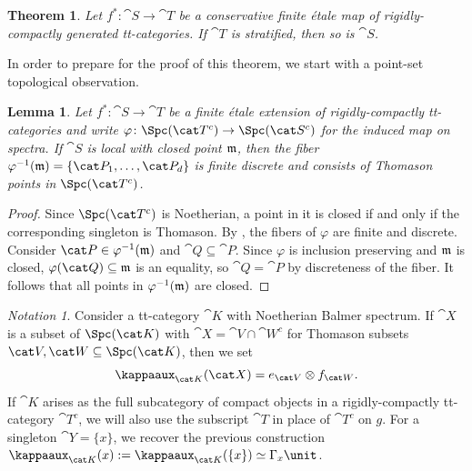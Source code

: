 \documentclass{amsart}%
\numberwithin{equation}{section}%
\newtheorem{Thm}[equation]{Theorem}
\newtheorem{Lem}[equation]{Lemma}
\theoremstyle{remark}
\newtheorem{Not}[equation]{Notation}
\begin{document}
\begin{Thm}\label{thm:etaledescent}
Let $f^*\colon \cat S \to \cat T$ be a conservative finite \'etale map of rigidly-compactly generated tt-categories. If $\cat T$ is stratified, then so is $\cat S$.
\end{Thm}

In order to prepare for the proof of this theorem, we start with a point-set topological observation.

\begin{Lem}\label{lem:closedfiber}
Let $f^*\colon \cat S \to \cat T$ be a finite \'etale extension of rigidly-compactly tt-categories and write $\varphi\colon \Spc(\cat T^c) \to \Spc(\cat S^c)$ for the induced map on spectra. If $\cat S$ is local with closed point $\frak m$, then the fiber $\varphi^{-1}(\frak m) = \{\cat P_1,\ldots, \cat P_d\}$ is finite discrete and consists of Thomason points in $\Spc(\cat T^c)$.
\end{Lem}
\begin{proof}
Since $\Spc(\cat T^c)$ is Noetherian, a point in it is closed if and only if the corresponding singleton is Thomason. By \cite[Thm.~1.5(d)]{Balmer16b}, the fibers of $\varphi$ are finite and discrete. Consider $\cat P \in \varphi^{-1}(\frak m)$ and $\cat Q \subseteq \cat P$. Since $\varphi$ is inclusion preserving and $\frak m$ is closed, $\varphi(\cat Q) \subseteq \frak m$ is an equality, so $\cat Q = \cat P$ by discreteness of the fiber. It follows that all points in $\varphi^{-1}(\frak m)$ are closed.
\end{proof}

\begin{Not}
Consider a tt-category  $\cat K$ with Noetherian Balmer spectrum. If $\cat X$ is a subset of $\Spc(\cat K)$ with $\cat X = \cat V \cap \cat W^c$ for Thomason subsets $\cat V, \cat W \subseteq \Spc(\cat K)$, then we set 
\[
\kappaaux_{\cat K}(\cat X) = e_{\cat V} \otimes f_{\cat W}.
\]
If $\cat K$ arises as the full subcategory of compact objects in a rigidly-compactly tt-category $\cat T^c$, we will also use the subscript $\cat T$ in place of $\cat T^c$ on $g$. For a singleton $\cat Y = \{x\}$, we recover the previous construction $\kappaaux_{\cat K}(x) := \kappaaux_{\cat K}(\{x\}) \simeq \Gamma_x\unit$. 
\end{Not}
\end{document}
